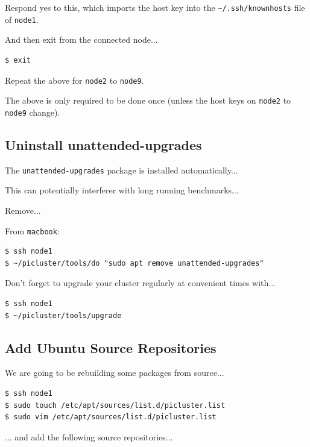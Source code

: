 \documentclass{report}
\begin{document}
Respond yes to this, which imports the host key into the \verb|~/.ssh/knownhosts| file of \verb|node1|.

And then exit from the connected node...

\lstset{style=termstyle}
\begin{lstlisting}[]
$ exit
\end{lstlisting}

Repeat the above for \verb|node2| to \verb|node9|.

The above is only required to be done once (unless the host keys on \verb|node2| to \verb|node9| change).


%
%

\subsection{Uninstall unattended-upgrades}

The \verb|unattended-upgrades| package is installed automatically...

This can potentially interferer with long running benchmarks...

Remove...

From \verb|macbook|:

\lstset{style=termstyle}
\begin{lstlisting}[]
$ ssh node1
$ ~/picluster/tools/do "sudo apt remove unattended-upgrades"
\end{lstlisting}

Don't forget to upgrade your cluster regularly at convenient times with...

\lstset{style=termstyle}
\begin{lstlisting}[]
$ ssh node1
$ ~/picluster/tools/upgrade
\end{lstlisting}


\subsection{Add Ubuntu Source Repositories}

We are going to be rebuilding some packages from source...

\lstset{style=termstyle}
\begin{lstlisting}[]
$ ssh node1
$ sudo touch /etc/apt/sources/list.d/picluster.list
$ sudo vim /etc/apt/sources/list.d/picluster.list
\end{lstlisting}

... and add the following source repositories...
\end{document}
